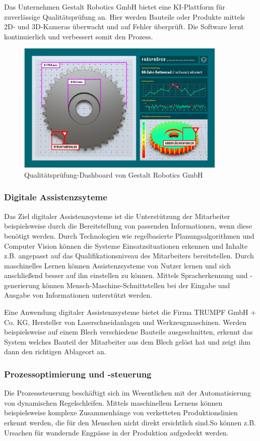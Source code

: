 \documentclass[a4paper,12pt, german]{report}
\begin{document}
Das Unternehmen Gestalt Robotics GmbH bietet eine KI-Plattform für zuverlässige Qualitätsprüfung an. Hier werden Bauteile oder Produkte mittels 2D- und 3D-Kameras überwacht und auf Fehler überprüft. Die Software lernt kontinuierlich und verbessert somit den Prozess. \cite{31}

\begin{figure}[H]
  \center
 \includegraphics[width=10cm]{images/Gestalt Robotics.png}
  \caption[Qualitätsprüfung-Dashboard von Gestalt Robotics GmbH]{Qualitätsprüfung-Dashboard von Gestalt Robotics GmbH \cite{31}}
\end{figure}

\subsubsection{Digitale Assistenzsyteme}
Das Ziel digitaler Assistenzsysteme ist die Unterstützung der Mitarbeiter beispielsweise durch die Bereitstellung von passenden Informationen, wenn diese benötigt werden. Durch Technologien wie
regelbasierte Planungsalgorithmen und Computer Vision können die Systeme Einsatzsituationen erkennen und Inhalte z.B. angepasst auf das Qualifikationsniveau des Mitarbeiters bereitstellen. Durch maschinelles Lernen können Assistenzsysteme von Nutzer lernen und sich anschließend besser auf ihn einstellen zu können. Mittels Spracherkennung und -generierung können Mensch-Maschine-Schnittstellen bei der Eingabe und Ausgabe von Informationen unterstützt werden.

Eine Anwendung digitaler Assistenzsysteme bietet die Firma TRUMPF GmbH + Co. KG, Hersteller von Laserschneidanlagen und Werkzeugmaschinen. Werden beispielsweise auf einem Blech verschiedene Bauteile ausgeschnitten, erkennt das System welches Bauteil der Mitarbeiter aus dem Blech gelöst hat und zeigt ihm dann den richtigen Ablageort an. \cite{24}

\subsubsection{Prozessoptimierung und -steuerung}
Die Prozesssteuerung beschäftigt sich im Wesentlichen mit der Automatisierung von dynamischen Regelschleifen. Mittels maschinellem Lernens können beispielsweise komplexe Zusammenhänge von verketteten Produktionslinien erkennt werden, die für den Menschen nicht direkt ersichtlich sind.So können z.B. Ursachen für wandernde Engpässe in der Produktion aufgedeckt werden.
\end{document}
